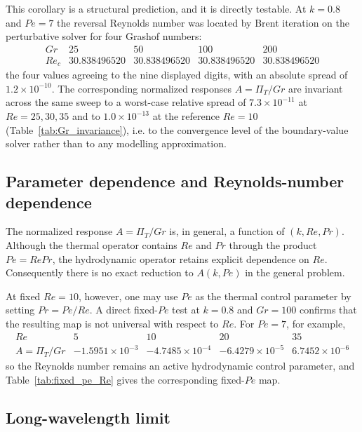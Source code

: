 \documentclass[12pt,a4paper]{article}
\newcommand{\Rey}{\mathit{Re}}
\newcommand{\Pe}{\mathit{Pe}}
\newcommand{\Grr}{\mathit{Gr}}
\renewcommand{\Pr}{\mathit{Pr}}
\newcommand{\PiT}{\Pi_T}
\begin{document}
This corollary is a structural prediction, and it is directly testable. At $k=0.8$ and $\Pe=7$ the reversal Reynolds number was located by
Brent iteration on the perturbative solver for four Grashof numbers:
\begin{equation}
\begin{array}{c|rrrr}
\Grr & 25 & 50 & 100 & 200\\ \hline
\Rey_c & 30.838496520 & 30.838496520 & 30.838496520 & 30.838496520
\end{array}
\label{eq:Rec_Gr}
\end{equation}
the four values agreeing to the nine displayed digits, with an absolute spread of
$1.2\times10^{-10}$. The corresponding normalized responses $A=\PiT/\Grr$ are invariant
across the same sweep to a worst-case relative spread of $7.3\times10^{-11}$ at
$\Rey=25,30,35$ and to $1.0\times10^{-13}$ at the reference $\Rey=10$
(Table~\ref{tab:Gr_invariance}), i.e. to the convergence level of the boundary-value
solver rather than to any modelling approximation.

\subsection{Parameter dependence and Reynolds-number dependence}

The normalized response $A=\PiT/\Grr$ is, in general, a function of $(k,\Rey,\Pr)$. Although the thermal
operator contains $\Rey$ and $\Pr$ through the product $\Pe=\Rey\Pr$, the hydrodynamic operator retains
explicit dependence on $\Rey$. Consequently there is no exact reduction to $A(k,\Pe)$ in the general problem.

At fixed $\Rey=10$, however, one may use $\Pe$ as the thermal control parameter by setting $\Pr=\Pe/\Rey$.
A direct fixed-$\Pe$ test at $k=0.8$ and $\Grr=100$ confirms that the resulting map is not universal with
respect to $\Rey$. For $\Pe=7$, for example,
\begin{equation}
\begin{array}{c|rrrr}
\Rey & 5 & 10 & 20 & 35\\ \hline
A=\PiT/\Grr & -1.5951\times10^{-3} & -4.7485\times10^{-4}
& -6.4279\times10^{-5} & 6.7452\times10^{-6}
\end{array}
\end{equation}
so the Reynolds number remains an active hydrodynamic control parameter, and
Table~\ref{tab:fixed_pe_Re} gives the corresponding fixed-$\Pe$ map.

\subsection{Long-wavelength limit}
\end{document}
